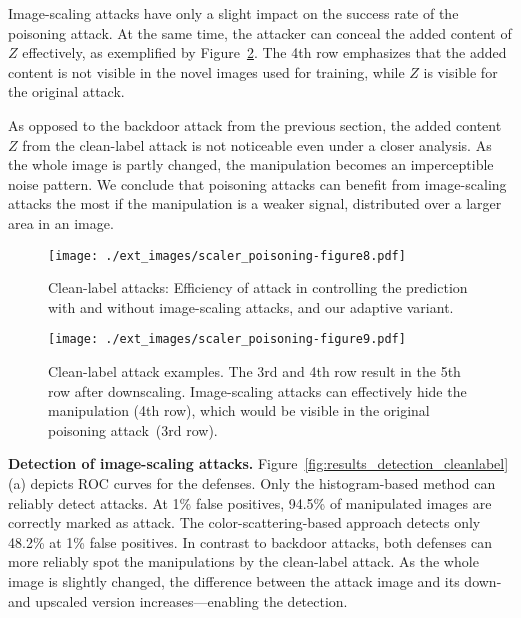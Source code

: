 \documentclass[conference]{IEEEtran}
\renewcommand{\paragraph}[1]{{\vskip 8pt \noindent\bf #1 }}
\newcommand{\ti}{\ensuremath{Z}\xspace}
\begin{document}
Image-scaling attacks have only a slight impact on 
the success rate of the poisoning attack. At the same time, the 
attacker can conceal the added content of $\ti$ effectively, as 
exemplified by Figure~\ref{fig:eval_cleanlabel_scaling_examples}. 
The 4th row emphasizes that the added content is not visible in the 
novel images used for training, while $\ti$ is visible for the original 
attack. 

As opposed to the backdoor attack from the previous section, the added
content \ti from the clean-label attack is not noticeable even under a
closer analysis.
As the whole image is partly changed, the manipulation becomes an 
imperceptible noise pattern. We conclude that poisoning attacks can 
benefit from image-scaling attacks the most if the manipulation is a 
weaker signal, distributed over a larger area in an image. 

\begin{figure}
	\centering
	\texttt{[image: ./ext\_images/scaler\_poisoning-figure8.pdf]}
	\vspace{-0.30cm}
	\caption{Clean-label attacks: Efficiency of attack in controlling 
	the prediction with and without image-scaling attacks, and our 
	adaptive variant.}
	\label{fig:eval_cleanlabel_scaling}
\end{figure}

\begin{figure}
	\centering
	\texttt{[image: ./ext\_images/scaler\_poisoning-figure9.pdf]}
	\caption{Clean-label attack examples. The 3rd and 4th row result in 
	the 5th row after downscaling. Image-scaling attacks can 
		effectively hide the manipulation (4th row), which would be 
		visible in the original poisoning attack~(3rd row).}
	\label{fig:eval_cleanlabel_scaling_examples}
\end{figure}

\paragraph{Detection of image-scaling attacks.}
Figure~\ref{fig:results_detection_cleanlabel}(a) depicts ROC curves for
the defenses. Only the histogram-based method
can reliably detect attacks. At 1\% false positives, 94.5\% of 
manipulated images are correctly marked as attack. The 
color-scattering-based approach detects only 48.2\% at 1\% false 
positives.
In contrast to backdoor attacks, both defenses can more reliably spot 
the manipulations by the clean-label attack. As the whole image is 
slightly changed, the difference between the attack image and its down- 
and upscaled version increases---enabling the detection. 
\end{document}
